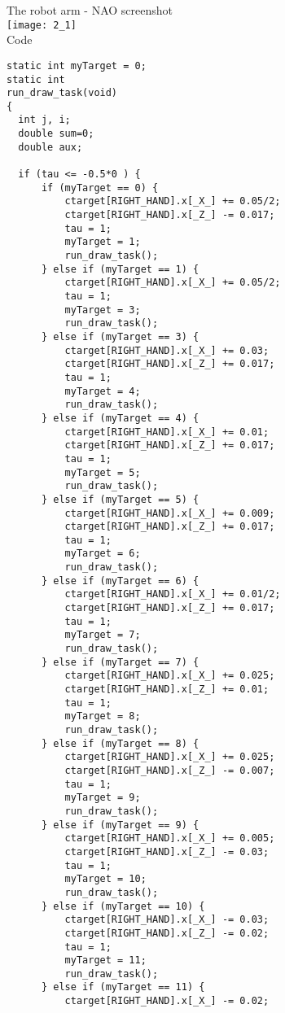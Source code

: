 \documentclass[12pt]{article}
\newenvironment{problem}[2][Problem]{\begin{trivlist}
\item[\hskip \labelsep {\bfseries #1}\hskip \labelsep {\bfseries #2.}]}{\end{trivlist}}
\begin{document}
\begin{problem} 2
\end{problem}
\begin{Answer}
The robot arm - NAO screenshot\\
\texttt{[image: 2\_1]}\\

Code
\begin{verbatim}
static int myTarget = 0;
static int 
run_draw_task(void)
{
  int j, i;
  double sum=0;
  double aux;

  if (tau <= -0.5*0 ) {
      if (myTarget == 0) {
          ctarget[RIGHT_HAND].x[_X_] += 0.05/2;
          ctarget[RIGHT_HAND].x[_Z_] -= 0.017;
          tau = 1;
          myTarget = 1;
          run_draw_task();
      } else if (myTarget == 1) {
          ctarget[RIGHT_HAND].x[_X_] += 0.05/2;
          tau = 1;
          myTarget = 3;
          run_draw_task();
      } else if (myTarget == 3) {
          ctarget[RIGHT_HAND].x[_X_] += 0.03;
          ctarget[RIGHT_HAND].x[_Z_] += 0.017;
          tau = 1;
          myTarget = 4;
          run_draw_task();
      } else if (myTarget == 4) {
          ctarget[RIGHT_HAND].x[_X_] += 0.01;
          ctarget[RIGHT_HAND].x[_Z_] += 0.017;
          tau = 1;
          myTarget = 5;
          run_draw_task();
      } else if (myTarget == 5) {
          ctarget[RIGHT_HAND].x[_X_] += 0.009;
          ctarget[RIGHT_HAND].x[_Z_] += 0.017;
          tau = 1;
          myTarget = 6;
          run_draw_task();
      } else if (myTarget == 6) {
          ctarget[RIGHT_HAND].x[_X_] += 0.01/2;
          ctarget[RIGHT_HAND].x[_Z_] += 0.017;
          tau = 1;
          myTarget = 7;
          run_draw_task();
      } else if (myTarget == 7) {
          ctarget[RIGHT_HAND].x[_X_] += 0.025;
          ctarget[RIGHT_HAND].x[_Z_] += 0.01;
          tau = 1;
          myTarget = 8;
          run_draw_task();
      } else if (myTarget == 8) {
          ctarget[RIGHT_HAND].x[_X_] += 0.025;
          ctarget[RIGHT_HAND].x[_Z_] -= 0.007;
          tau = 1;
          myTarget = 9;
          run_draw_task();
      } else if (myTarget == 9) {
          ctarget[RIGHT_HAND].x[_X_] += 0.005;
          ctarget[RIGHT_HAND].x[_Z_] -= 0.03;
          tau = 1;
          myTarget = 10;
          run_draw_task();
      } else if (myTarget == 10) {
          ctarget[RIGHT_HAND].x[_X_] -= 0.03;
          ctarget[RIGHT_HAND].x[_Z_] -= 0.02;
          tau = 1;
          myTarget = 11;
          run_draw_task();
      } else if (myTarget == 11) {
          ctarget[RIGHT_HAND].x[_X_] -= 0.02;

\end{verbatim}
\end{Answer}
\end{document}
